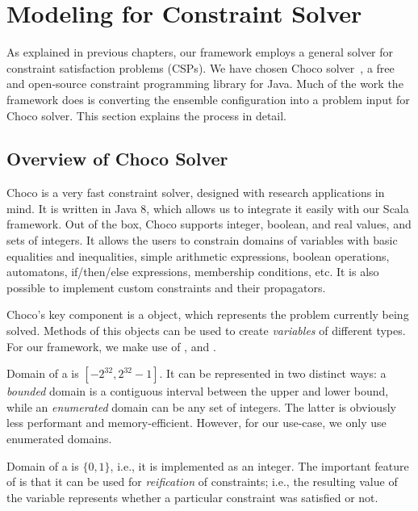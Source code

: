 \section{Modeling for Constraint Solver}
\label{impl:solver}

As explained in previous chapters, our framework employs a general solver for constraint
satisfaction problems (CSPs). We have chosen Choco solver~\citep{choco}, a free and
open-source constraint programming library for Java. Much of the work the framework does
is converting the ensemble configuration into a problem input for Choco solver. This
section explains the process in detail.


\subsection{Overview of Choco Solver}

Choco is a very fast constraint solver, designed with research applications in mind. It
is written in Java 8, which allows us to integrate it easily with our Scala framework.
Out of the box, Choco supports integer, boolean, and real values, and sets of integers.
It allows the users to constrain domains of variables with basic equalities and
inequalities, simple arithmetic expressions, boolean operations, automatons,
if/then/else expressions, membership conditions, etc. It is also possible to implement
custom constraints and their propagators.

Choco's key component is a  object, which represents the problem currently
being solved. Methods of this objects can be used to create \textit{variables} of
different types. For our framework, we make use of ,  and
.

\medskip

Domain of a  is $[-2^{32}, 2^{32}-1]$. It can be represented in two distinct
ways: a \textit{bounded} domain is a contiguous interval between the upper and lower
bound, while an \textit{enumerated} domain can be any set of integers. The latter is
obviously less performant and memory-efficient. However, for our use-case, we only use
enumerated domains.

Domain of a  is $\{0, 1\}$, i.e., it is implemented as an integer. The
important feature of  is that it can be used for \textit{reification} of
constraints; i.e., the resulting value of the variable represents whether a particular
constraint was satisfied or not.

